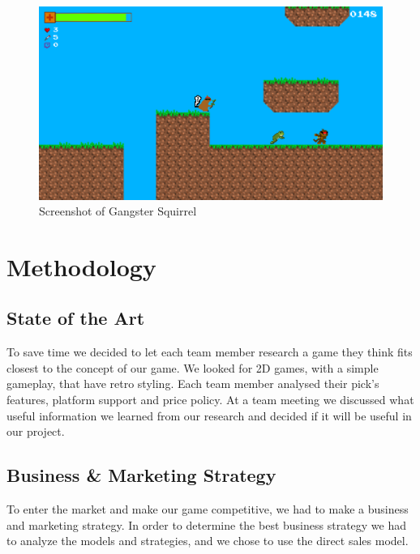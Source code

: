 \documentclass[12p]{article}
\begin{document}
\begin{figure}[ht]
 \center
 \includegraphics[width=1\textwidth]{screenshot.png}
 \caption{Screenshot of Gangster Squirrel}
\end{figure}


\newpage
\section{Methodology} \label{Methodology}

\subsection{State of the Art}

To save time we decided to let each team member research a game they think fits closest to the concept of our game. We looked for 2D games, with a simple gameplay, that have retro styling. Each team member analysed their pick's features, platform support and price policy. At a team meeting we discussed what useful information we learned from our research and decided if it will be useful in our project.

\subsection{Business \& Marketing Strategy}
To enter the market and make our game competitive, we had to make a business and marketing strategy. In order to determine the best business strategy we had to analyze the models and strategies, and we chose to use the direct sales model.   
\end{document}

